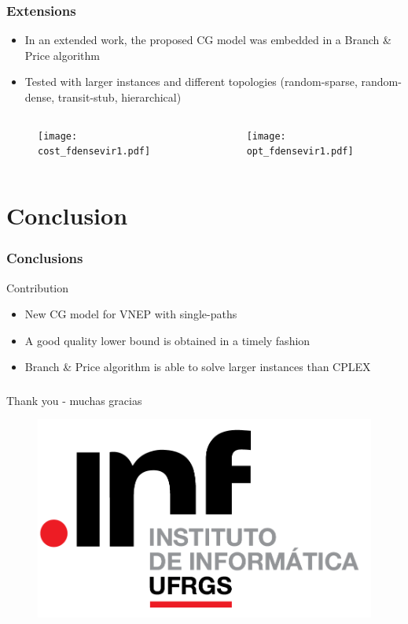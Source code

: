 \documentclass[english]{beamer}
\begin{document}
\begin{frame}
\frametitle{Extensions}
\begin{itemize}
  \item In an extended work, the proposed CG model was embedded in a Branch \& Price algorithm
  \item Tested with larger instances and different topologies (random-sparse, random-dense, transit-stub, hierarchical)
\end{itemize}
\begin{columns}
\begin{column}{0.5\textwidth}
  \begin{figure}
    \centering
    \texttt{[image: cost\_fdensevir1.pdf]}
  \end{figure}
\end{column}
\begin{column}{0.5\textwidth}
  \begin{figure}
    \centering
    \texttt{[image: opt\_fdensevir1.pdf]}
  \end{figure}
\end{column}
\end{columns}
\end{frame}
\section{Conclusion}
\begin{frame}
\frametitle{Conclusions}
Contribution
\begin{itemize}
	\item New CG model for VNEP with single-paths
	\item A good quality lower bound is obtained in a timely fashion
  \item Branch \& Price algorithm is able to solve larger instances than CPLEX
\end{itemize}
\end{frame}
\begin{frame}
\frametitle{}
\huge
{ \center Thank you - muchas gracias }
\begin{figure}
    \centering
    \includegraphics[scale=0.4]{inf.png}
\end{figure}
\end{frame}
\begin{frame}[allowframebreaks]


\end{frame}
\end{document}
